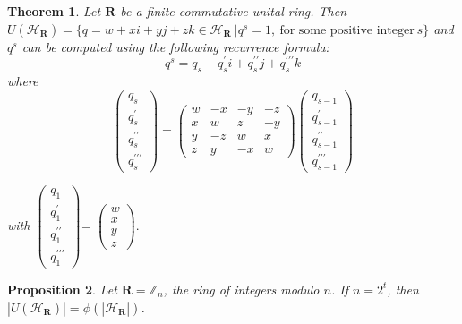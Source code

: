 \documentclass[sn-mathphys,Numbered]{sn-jnl}%
\theoremstyle{thmstyleone}
\newtheorem{theorem}{Theorem}
\newtheorem{proposition}[theorem]{Proposition}
\theoremstyle{thmstyletwo}
\theoremstyle{thmstylethree}
\begin{document}
\begin{theorem} \label{t1}
Let $\mathbf{R}$ be a finite commutative unital ring. Then $U(\mathcal{H_{\mathbf{R}}})=\{ q=w+xi+yj+zk \in \mathcal{H_{\mathbf{R}}} \ | q^{s}=1, \ \text{for some positive integer} \ s \}$ and $q^{s}$ can be computed using the following recurrence formula:\\
$$q^{s}=q_{s}+q_{s}^{\prime}i+q_{s}^{\prime \prime}j+q_{s}^{\prime \prime \prime }k $$ where \\
 
 $$ \left( \begin{array}{c}
 q_{s} \\
 q_{s}^{\prime} \\
 q_{s}^{\prime \prime} \\
 q_{s}^{\prime \prime \prime }
 \end{array}\right)
 = \left(\begin{array}{cccc} 
w & -x & -y& -z \\
x & w & z & -y \\
y & -z & w & x \\
z & y & -x & w 
\end{array} \right)
 \left( \begin{array}{c}
 q_{s-1} \\
 q_{s-1}^{\prime} \\
 q_{s-1}^{\prime \prime} \\
 q_{s-1}^{\prime \prime \prime }
 
 
  \end{array}\right)$$

 with  
$\left( \begin{array}{c}
 q_{1} \\
 q_{1}^{\prime} \\
 q_{1}^{\prime \prime} \\
 q_{1}^{\prime \prime \prime }
 
 
  \end{array}\right)$= $\left( \begin{array}{c}
 w \\
 x\\
 y \\
 z
 
 
  \end{array}\right).$
  
\end{theorem}
\begin{proposition}
Let $\mathbf{R}=\mathbb{Z}_{n}$, the ring of integers modulo $n$. If $n=2^{t}$, then $|U(\mathcal{H_{\mathbf{R}}})|=\phi(|\mathcal{H_{\mathbf{R}}}|)$.
\end{proposition}
\end{document}
